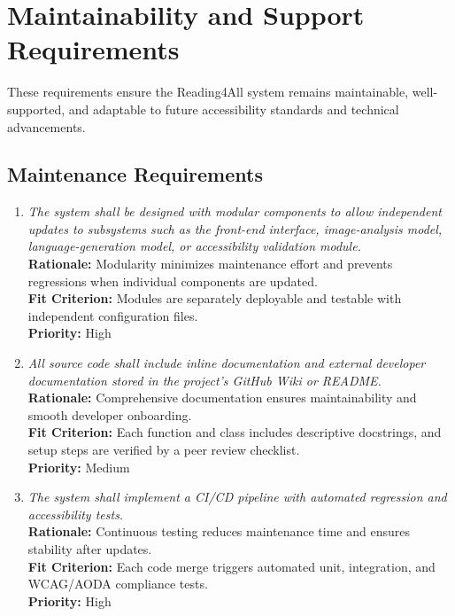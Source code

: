 \documentclass[12pt]{article}
\begin{document}
\section{Maintainability and Support Requirements}

These requirements ensure the Reading4All system remains
maintainable, well-supported, and adaptable to future accessibility
standards and technical advancements.

\subsection{Maintenance Requirements}

\begin{enumerate}[label=MS-MNT\arabic*., wide=0pt, leftmargin=*]
  \item \emph{The system shall be designed with modular components to
      allow independent updates to subsystems such as the front-end
      interface, image-analysis model, language-generation model, or
    accessibility validation module.}\\[2mm]
    {\bf Rationale:} Modularity minimizes maintenance effort and
    prevents regressions when individual components are updated.\\
    {\bf Fit Criterion:} Modules are separately deployable and
    testable with independent configuration files.\\
    {\bf Priority:} High

  \item \emph{All source code shall include inline documentation and
      external developer documentation stored in the project’s GitHub
    Wiki or README.}\\[2mm]
    {\bf Rationale:} Comprehensive documentation ensures
    maintainability and smooth developer onboarding.\\
    {\bf Fit Criterion:} Each function and class includes descriptive
    docstrings, and setup steps are verified by a peer review checklist.\\
    {\bf Priority:} Medium

  \item \emph{The system shall implement a CI/CD pipeline with
    automated regression and accessibility tests.}\\[2mm]
    {\bf Rationale:} Continuous testing reduces maintenance time and
    ensures stability after updates.\\
    {\bf Fit Criterion:} Each code merge triggers automated unit,
    integration, and WCAG/AODA compliance tests.\\
    {\bf Priority:} High
\end{enumerate}
\end{document}
